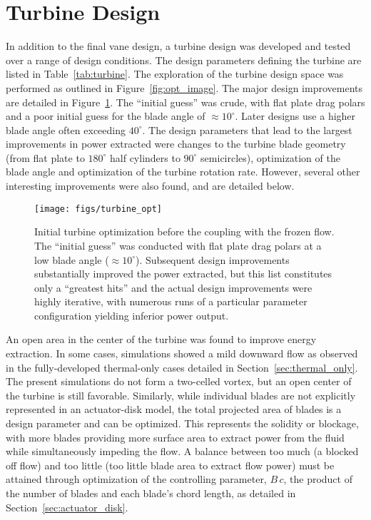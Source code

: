 %
%

\section{Turbine Design}
\label{sec:turb_design}

In addition to the final vane design, a turbine design was developed and
tested over a range of design conditions. The design parameters defining
the turbine are listed in Table~\ref{tab:turbine}. The exploration of the
turbine design space was performed as outlined in
Figure~\ref{fig:opt_image}. The major design improvements are detailed
in Figure~\ref{fig:ut_turbine}. The ``initial guess'' was crude, with
flat plate drag polars and a poor 
initial guess for the blade angle of $\approx 10^{\circ}$. Later
designs use a higher blade angle often exceeding $40^{\circ}$. 
The design parameters that lead to the largest improvements in power
extracted were changes to the turbine blade geometry (from flat plate to
$180^{\circ}$ half cylinders to $90^{\circ}$ semicircles), optimization
of the blade angle and optimization of the turbine rotation rate. 
However, several other interesting improvements were also found, and are
detailed below.  

  \begin{figure}[!htb]
   \begin{center}
    \texttt{[image: figs/turbine\_opt]}
    \caption{Initial turbine optimization before the coupling with the
    frozen flow. The ``initial guess'' was conducted with flat plate
    drag polars at a low blade angle ($\approx
    10^{\circ}$). Subsequent design improvements substantially improved  
    the power extracted, but this list constitutes only a ``greatest
    hits'' and the actual design improvements were highly iterative,
    with numerous runs of a particular parameter configuration yielding
    inferior power output. }
    \label{fig:ut_turbine}
   \end{center}
  \end{figure}

An open area in the center of the turbine was found to improve energy
extraction. In some cases, simulations showed a mild downward flow as
observed in the fully-developed thermal-only cases detailed in
Section~\ref{sec:thermal_only}. The present simulations do not form a
two-celled vortex, but an open center of the turbine is still
favorable. Similarly, while individual blades are not explicitly
represented in an actuator-disk model, the total projected area of
blades is a design parameter and can be optimized. This represents the
solidity or blockage, with more blades providing more surface area to extract
power from the fluid while simultaneously impeding the flow. A balance
between too much (a blocked off flow) and too little (too little blade
area to extract flow power) must be attained through optimization of the
controlling parameter, $B \, c$, the product of the number of blades and
each blade's chord length, as detailed in
Section~\ref{sec:actuator_disk}. 

